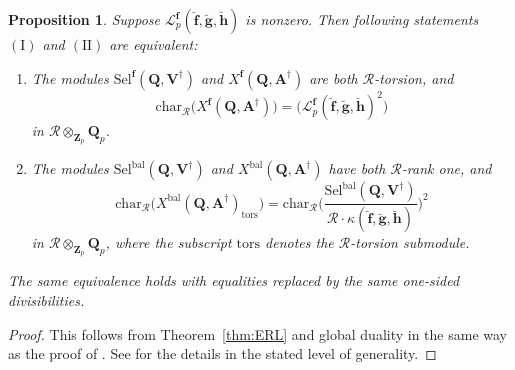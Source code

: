 \documentclass[10pt,letterpaper]{amsart}
\theoremstyle{plain}
\theoremstyle{definition}
\theoremstyle{definition}
\theoremstyle{plain}
\newtheorem{prop}[thm]{Proposition}
\theoremstyle{plain}
\theoremstyle{plain}
\theoremstyle{remark}
\numberwithin{equation}{section}
\newcommand{\rH}{H}
\newcommand{\ppbar}{\bar{\mathfrak{p}}}
\newcommand{\Vdag}{{\mathbf{V}^\dagger}}
\newcommand{\Adag}{{\mathbf{A}^\dagger}}
\newcommand{\unb}{{\boldsymbol{f}}}
\newcommand{\Q}{\mathbf{Q}}
\newcommand{\Z}{\mathbf{Z}}
\newcommand{\bff}{{\boldsymbol{f}}}
\newcommand{\bfg}{{\boldsymbol{g}}}
\newcommand{\bfh}{{\boldsymbol{h}}}
\begin{document}
\begin{prop}\label{prop:equiv}
Suppose $\mathscr{L}_p^{\bff}(\breve{\bff},\breve{\bfg},\breve{\bfh})$ is nonzero. Then following statements ${\mathrm{(I)}}$ and ${\mathrm{(II)}}$ are equivalent:
\begin{enumerate}
\item[(I)] The modules ${\mathrm{Sel}}^{\unb}(\Q,\Vdag)$ and $X^{\unb}(\Q,\Adag)$ are both $\mathcal{R}$-torsion, and 
\[
{\mathrm{char}}_\mathcal{R}\bigl(X^{\unb}(\Q,\Adag)\bigr)=\bigl(\mathscr{L}_p^\unb(\breve{\bff},\breve{\bfg},\breve{\bfh})^2\bigr)
\]
in $\mathcal{R}\otimes_{\Z_p}\Q_p$.

\item[(II)] %
The modules ${\mathrm{Sel}}^{\mathrm{bal}}(\Q,\Vdag)$ and $X^{\mathrm{bal}}(\Q,\Adag)$ have both $\mathcal{R}$-rank one, and
\[
{\mathrm{char}}_{\mathcal{R}}\bigl(X^{\mathrm{bal}}(\Q,\Adag)_{\mathrm{tors}}\bigr)={\mathrm{char}}_{\mathcal{R}}\biggl(\frac{{\mathrm{Sel}}^{\mathrm{bal}}(\Q,\Vdag)}{\mathcal{R}\cdot\kappa(\breve{\bff},\breve{\bfg},\breve{\bfh})}\biggr)^2
\]
in $\mathcal{R}\otimes_{\Z_p}\Q_p$, where the subscript ${\mathrm{tors}}$ denotes the $\mathcal{R}$-torsion submodule.
\end{enumerate}
The same equivalence holds with equalities replaced by the same one-sided divisibilities.
\end{prop}

\begin{proof}
This follows from Theorem~\ref{thm:ERL} and global duality in the same way as the proof of \cite[Thm.~7.15]{ACR}. See \cite{Lai-PhD} for the details in the stated level of generality.
%
\end{proof}
\end{document}
